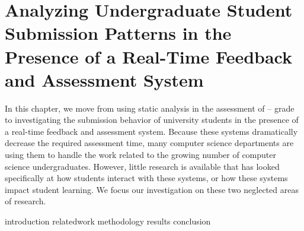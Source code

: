 \chapter{Analyzing Undergraduate Student Submission Patterns in the Presence of
  a Real-Time Feedback and Assessment System}
\label{chap:feedback}

\def\currentprefix{feedback}

In this chapter, we move from using static analysis in the assessment of
-- grade  to investigating the submission behavior of
university students in the presence of a real-time feedback and assessment
system. Because these systems dramatically decrease the required assessment
time, many computer science departments are using them to handle the work
related to the growing number of computer science undergraduates. However,
little research is available that has looked specifically at how students
interact with these systems, or how these systems impact student learning. We
focus our investigation on these two neglected areas of research.

\iffull
{introduction}
{relatedwork}
{methodology}
{results}
{conclusion}
\fi
